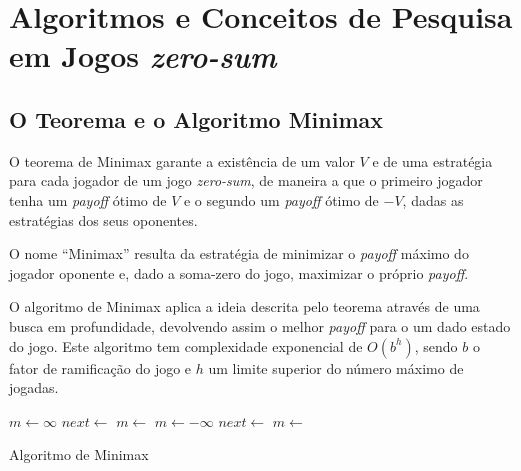 \documentclass[12pt,a4paper,oneside]{article}
\begin{document}

\section{Algoritmos e Conceitos de Pesquisa em Jogos \textit{zero-sum}}
\label{sec:algconc}

\cite{Dutra:2015}
\lipsum[1]

\lipsum[2]

\subsection{O Teorema e o Algoritmo Minimax}

O teorema de Minimax garante a existência de um valor $V$ e de uma estratégia para cada jogador de um jogo \emph{zero-sum}, de maneira a que o primeiro jogador tenha um \emph{payoff} ótimo de $V$ e o segundo um \emph{payoff} ótimo de $-V$, dadas as estratégias dos seus oponentes.

O nome ``Minimax'' resulta da estratégia de minimizar o \emph{payoff} máximo do jogador oponente e, dado a soma-zero do jogo, maximizar o próprio \emph{payoff}.

O algoritmo de Minimax aplica a ideia descrita pelo teorema através de uma busca em profundidade, devolvendo assim o melhor \emph{payoff} para o um dado estado do jogo. Este algoritmo tem complexidade exponencial de $O(b^{h})$, sendo $b$ o fator de ramificação do jogo e $h$ um limite superior do número máximo de jogadas.

\begin{algorithm}
\begin{algorithmic}
 
   
  \EndIf
      \State $m \gets \infty$
          \State $next \gets$ 
          \State $m \gets$ 
      \EndFor
      \State $m \gets -\infty$
          \State $next \gets$ 
          \State $m \gets$ 
      \EndFor
  \EndIf
  \State{} 
\EndFunction
\end{algorithmic}
\caption{Algoritmo de Minimax}
\end{algorithm}
\end{document}
